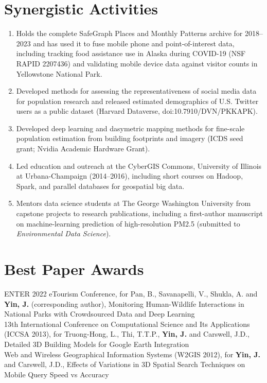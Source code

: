 \documentclass[11pt, a4paper]{article}
\newcommand{\years}[1]{\marginnote{\scriptsize #1}}
\begin{document}
\section*{Synergistic Activities}
\begin{enumerate}
\setlength\itemsep{0em}
\item Holds the complete SafeGraph Places and Monthly Patterns archive for 2018--2023 and has used it to fuse mobile phone and point-of-interest data, including tracking food assistance use in Alaska during COVID-19 (NSF RAPID 2207436) and validating mobile device data against visitor counts in Yellowstone National Park.
\item Developed methods for assessing the representativeness of social media data for population research and released estimated demographics of U.S. Twitter users as a public dataset (Harvard Dataverse, doi:10.7910/DVN/PKKAPK).
\item Developed deep learning and dasymetric mapping methods for fine-scale population estimation from building footprints and imagery (ICDS seed grant; Nvidia Academic Hardware Grant).
\item Led education and outreach at the CyberGIS Commons, University of Illinois at Urbana-Champaign (2014--2016), including short courses on Hadoop, Spark, and parallel databases for geospatial big data.
\item Mentors data science students at The George Washington University from capstone projects to research publications, including a first-author manuscript on machine-learning prediction of high-resolution PM2.5 (submitted to \textit{Environmental Data Science}).
\end{enumerate}

\section*{Best Paper Awards}
\years{2022}ENTER 2022 eTourism Conference, for Pan, B., Savanapelli, V., Shukla, A. and \textbf{Yin, J.} (corresponding author), Monitoring Human-Wildlife Interactions in National Parks with Crowdsourced Data and Deep Learning\\
\years{2013}13th International Conference on Computational Science and Its Applications (ICCSA 2013), for Truong-Hong, L., Thi, T.T.P., \textbf{Yin, J.} and Carswell, J.D., Detailed 3D Building Models for Google Earth Integration\\
\years{2012}Web and Wireless Geographical Information Systems (W2GIS 2012), for \textbf{Yin, J.} and Carswell, J.D., Effects of Variations in 3D Spatial Search Techniques on Mobile Query Speed vs Accuracy
\end{document}
